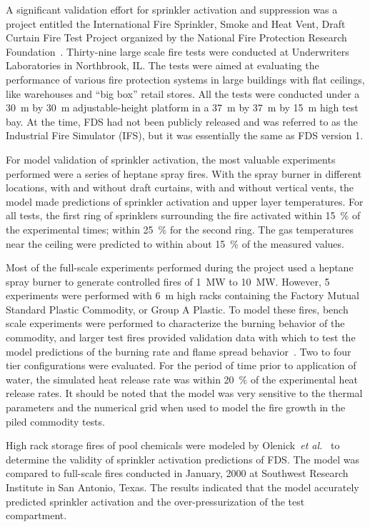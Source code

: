 A   significant  validation  effort   for  sprinkler   activation  and suppression was  a project entitled the  International Fire Sprinkler, Smoke
and Heat Vent, Draft  Curtain Fire Test Project organized by the National   Fire  Protection   Research  Foundation~\cite{McGrattan:5}. Thirty-nine
large scale  fire  tests were  conducted at  Underwriters Laboratories in  Northbrook, IL.  The  tests were aimed  at evaluating the performance of
various  fire protection systems in large buildings with  flat ceilings, like  warehouses and  ``big box''  retail stores. All the  tests were
conducted  under a 30~m by  30~m adjustable-height platform in a 37~m by 37~m by 15~m high test bay. At the time, FDS had not been publicly released
and  was referred to as the Industrial Fire Simulator (IFS), but it was essentially the same as FDS version 1.

For  model  validation  of  sprinkler activation,  the  most  valuable experiments performed were a series  of heptane spray fires.  With the spray
burner in different  locations, with and without draft curtains, with  and  without  vertical  vents,  the model  made  predictions  of sprinkler
activation and upper layer temperatures.  For all tests, the first ring  of sprinklers surrounding the fire  activated within 15~\% of the
experimental  times; within 25~\% for the  second ring. The gas temperatures near the ceiling were  predicted to within about 15~\% of the measured
values.

Most of the full-scale experiments performed during the project used a heptane  spray  burner  to   generate  controlled  fires  of  1~MW  to 10~MW.
However, 5  experiments  were performed  with  6~m high  racks containing the  Factory Mutual Standard Plastic Commodity,  or Group A Plastic. To
model these  fires, bench scale experiments were performed to characterize the burning behavior of the commodity, and larger test fires  provided
validation  data  with  which  to   test  the  model predictions    of    the     burning    rate    and    flame    spread
behavior~\cite{Hamins:1,Hamins:IAFSS2002}.     Two   to    four   tier configurations  were  evaluated.  For  the  period  of  time prior  to
application of water, the simulated heat release rate was within 20~\% of the experimental  heat release rates.  It should  be noted that the model
was very  sensitive to the thermal parameters  and the numerical grid when used to model the fire growth in the piled commodity tests.


High rack storage fires of pool chemicals were modeled by Olenick~{\em et  al.}~\cite{Olenick:1}  to  determine  the  validity  of  sprinkler
activation predictions  of FDS.  The model was  compared to full-scale fires conducted  in January, 2000  at Southwest Research  Institute in San
Antonio,  Texas.  The results indicated that  the model accurately predicted sprinkler activation and the over-pressurization of the test
compartment.

